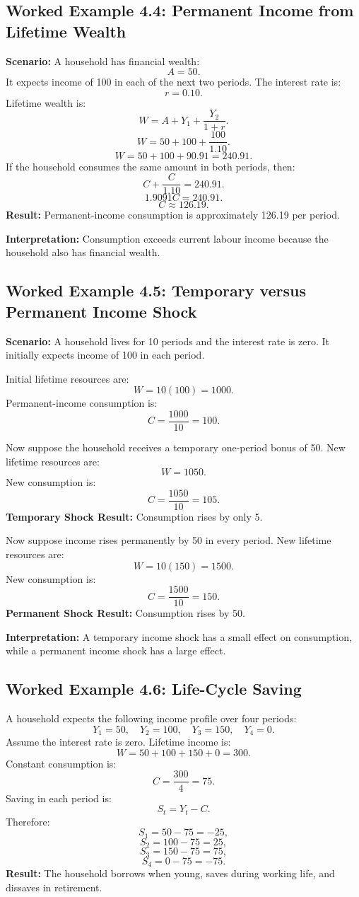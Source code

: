\documentclass[12pt,a4paper]{article}
\begin{document}
\subsection*{Worked Example 4.4: Permanent Income from Lifetime Wealth}
\textbf{Scenario:} A household has financial wealth:
\[ A = 50. \]
It expects income of 100 in each of the next two periods. The interest rate is:
\[ r = 0.10. \]
Lifetime wealth is:
\[ W = A + Y_1 + \frac{Y_2}{1+r}. \]
\[ W = 50 + 100 + \frac{100}{1.10}. \]
\[ W = 50 + 100 + 90.91 = 240.91. \]
If the household consumes the same amount in both periods, then:
\[ C + \frac{C}{1.10} = 240.91. \]
\[ 1.9091C = 240.91. \]
\[ C \approx 126.19. \]
\textbf{Result:} Permanent-income consumption is approximately 126.19 per period.

\textbf{Interpretation:} Consumption exceeds current labour income because the household also has financial wealth.

\subsection*{Worked Example 4.5: Temporary versus Permanent Income Shock}
\textbf{Scenario:} A household lives for 10 periods and the interest rate is zero. It initially expects income of 100 in each period.

Initial lifetime resources are:
\[ W = 10(100) = 1000. \]
Permanent-income consumption is:
\[ C = \frac{1000}{10} = 100. \]

Now suppose the household receives a temporary one-period bonus of 50.
New lifetime resources are:
\[ W = 1050. \]
New consumption is:
\[ C = \frac{1050}{10} = 105. \]
\textbf{Temporary Shock Result:} Consumption rises by only 5.

Now suppose income rises permanently by 50 in every period.
New lifetime resources are:
\[ W = 10(150) = 1500. \]
New consumption is:
\[ C = \frac{1500}{10} = 150. \]
\textbf{Permanent Shock Result:} Consumption rises by 50.

\textbf{Interpretation:} A temporary income shock has a small effect on consumption, while a permanent income shock has a large effect.

\subsection*{Worked Example 4.6: Life-Cycle Saving}
A household expects the following income profile over four periods:
\[ Y_1 = 50, \quad Y_2 = 100, \quad Y_3 = 150, \quad Y_4 = 0. \]
Assume the interest rate is zero.
Lifetime income is:
\[ W = 50 + 100 + 150 + 0 = 300. \]
Constant consumption is:
\[ C = \frac{300}{4} = 75. \]
Saving in each period is:
\[ S_t = Y_t - C. \]
Therefore:
\[ S_1 = 50 - 75 = -25, \]
\[ S_2 = 100 - 75 = 25, \]
\[ S_3 = 150 - 75 = 75, \]
\[ S_4 = 0 - 75 = -75. \]
\textbf{Result:} The household borrows when young, saves during working life, and dissaves in retirement.
\end{document}
